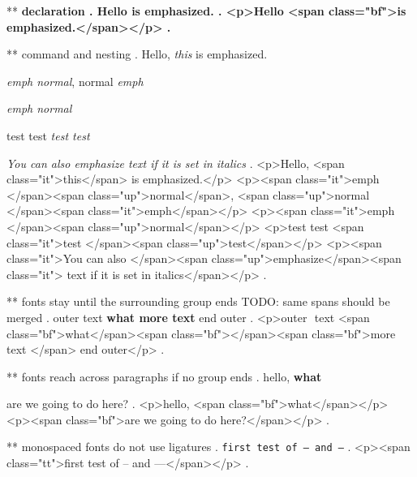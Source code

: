** \bfseries declaration
.
Hello \bfseries is emphasized.
.
<p>Hello <span class="bf">is emphasized.</span></p>
.

** \emph{} command and nesting
.
Hello, \emph{this} is emphasized.

\emph{emph \textup{normal}}, \textup{normal \emph{emph}}

\emph{emph \emph{normal}}

test {test \em\em\em test \em test}

\textit{You can also \emph{emphasize} text if it is set in italics}
.
<p>Hello, <span class="it">this</span> is emphasized.</p>
<p><span class="it">emph </span><span class="up">normal</span>, <span class="up">normal </span><span class="it">emph</span></p>
<p><span class="it">emph </span><span class="up">normal</span></p>
<p>test test <span class="it">test </span><span class="up">test</span></p>
<p><span class="it">You can also </span><span class="up">emphasize</span><span class="it"> text if it is set in italics</span></p>
.


** fonts stay until the surrounding group ends      TODO: same spans should be merged
.
outer { text \bfseries {what} more text } end outer
.
<p>outer ​ text <span class="bf">what</span><span class="bf">​ </span><span class="bf">more text </span>​ end outer</p>
.


** fonts reach across paragraphs if no group ends
.
hello, \bfseries what

are we going to do here?
.
<p>hello, <span class="bf">what</span></p>
<p><span class="bf">are we going to do here?</span></p>
.


** monospaced fonts do not use ligatures
.
\texttt{first test of -- and ---}
.
<p><span class="tt">first test of -- and ---</span></p>
.
